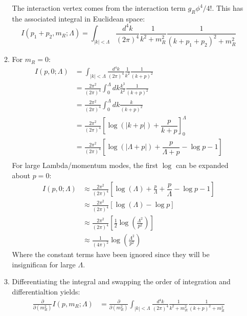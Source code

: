 \documentclass[12pt,a4]{article}
\begin{document}
\begin{enumerate}
\begin{enumerate}
        The interaction vertex comes from the interaction term $g_R \phi^4 / 4!$.
        This has the associated integral in Euclidean space:
        \begin{equation*}
          I(p_1 + p_2, m_R;\Lambda) = \int_{|k| < \Lambda} \frac{d^4 k}{(2 \pi)^4} \frac{1}{k^2 + m_R^2} \frac{1}{(k + p_1 + p_2)^2 + m_R^2}
        \end{equation*}
      \item
        For $m_R = 0$:
        \begin{align*}
          I(p, 0;\Lambda) &= \int_{|k| < \Lambda} \frac{d^4 k}{(2 \pi)^4} \frac{1}{k^2} \frac{1}{(k + p)^2}\\
                          &= \frac{2 \pi^2}{(2 \pi)^4} \int_{0 }^{\Lambda}  d k\frac{k^3}{k^2} \frac{1}{(k + p)^2}\\
                          &= \frac{2 \pi^2}{(2 \pi)^4} \int_{0 }^{\Lambda}  d k \frac{k}{(k + p)^2}\\
                          &= \frac{2 \pi^2}{(2 \pi)^4} \left[ \log\left(\left|k+p\right|\right)+\dfrac{p}{k+p}\right]_0^\Lambda\\
                          &= \frac{2 \pi^2}{(2 \pi)^4} \left[ \log\left(\left|\Lambda + p\right|\right)+\dfrac{p}{\Lambda +p } - \log p - 1\right]\\
        \end{align*}
        For large Lambda/momentum modes, the first $\log$ can be expanded about $p = 0$:
        \begin{align*}
          I(p, 0;\Lambda) &\approx \frac{2 \pi^2}{(2 \pi)^4} \left[ \log\left(\Lambda\right) + \frac{p}{\Lambda} + \dfrac{p}{\Lambda} - \log p - 1\right]\\
                          &\approx \frac{2 \pi^2}{(2 \pi)^4} \left[ \log\left(\Lambda\right)  - \log p \right]\\
                          &\approx \frac{2 \pi^2}{(2 \pi)^4} \left[ \frac{1}{2}\log\left(\frac{\Lambda^2}{p^2}\right)\right]\\
                          &\approx \frac{1}{(4 \pi)^2} \log\left(\frac{\Lambda^2}{p^2}\right)
        \end{align*}
        Where the constant terms have been ignored since they will be insignifican for large $\Lambda$.
      \item
        Differentiating the integral and swapping the order of integration and differentialtion yields:
        \begin{align*}
          \frac{\partial}{\partial (m^2_R)}I(p, m_R;\Lambda) &= \frac{\partial}{\partial (m^2_R)}\int_{|k| < \Lambda} \frac{d^4 k}{(2 \pi)^4} \frac{1}{k^2 + m_R^2} \frac{1}{(k + p)^2 + m_R^2}\\

\end{align*}
\end{enumerate}
\end{enumerate}
\end{document}
